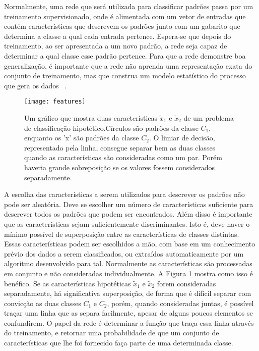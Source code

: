 Normalmente, uma rede que será utilizada para classificar padrões passa por um treinamento supervisionado, onde é alimentada com um vetor de entradas que contém características que descrevem os padrões junto com um gabarito que determina a classe a qual cada entrada pertence. Espera-se que depois do treinamento, ao ser apresentada a um novo padrão, a rede seja capaz de determinar a qual classe esse padrão pertence. Para que a rede demonstre boa generalização, é importante que a rede não aprenda uma representação exata do conjunto de treinamento, mas que construa um modelo estatístico do processo que gera os dados ~\cite{NNForPR}.

\begin{figure}[!ht]
\centering
\texttt{[image: features]}
\caption[Um gráfico que mostra duas características $\tilde{x}_1$ e $\tilde{x}_2$ de um problema de classificação hipotético.]{Um gráfico que mostra duas características $\tilde{x}_1$ e $\tilde{x}_2$ de um problema de classificação hipotético.\protect\footnotemark  Círculos são padrões da classe $C_1$, enquanto os 'x' são padrões da classe $C_2$. O limiar de decisão, representado pela linha, consegue separar bem as duas classes quando as características são consideradas como um par. Porém haveria grande sobreposição se os valores fossem considerados separadamente.}
\label{fig:features}
\centering
\end{figure}
A escolha das características a serem utilizados para descrever os padrões não pode ser aleatória. Deve se escolher um número de características suficiente para descrever todos os padrões que podem ser encontrados. Além disso é importante que as características sejam suficientemente discriminantes. Isto é, deve haver o mínimo possível de superposição entre as características de classes distintas. Essas características podem ser escolhidos a mão, com base em um conhecimento prévio dos dados a serem classificados, ou extraídos automaticamente por um algoritmo desenvolvido para tal. Normalmente as características são processadas em conjunto e não consideradas individualmente. A Figura \ref{fig:features} mostra como isso é benéfico. Se as características hipotéticas $\tilde{x}_1$ e $\tilde{x}_2$ forem consideradas separadamente, há significativa superposição, de forma que é difícil separar com convicção as duas classes $C_1$ e $C_2$, porém, quando consideradas juntas, é possível traçar uma linha que as separa facilmente, apesar de alguns poucos elementos se confundirem. O papel da rede é determinar a função que traça essa linha através do treinamento, e retornar uma probabilidade de que um conjunto de características que lhe foi fornecido faça parte de uma determinada classe.



